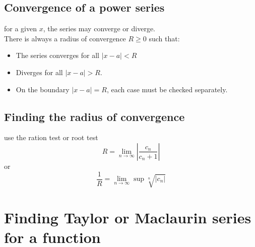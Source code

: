 \documentclass{article}
\begin{document}
                                    \subsection{Convergence of a power series}
                                        for a given \(x\), the series may converge or diverge.\\ 
                                        There is always a radius of convergence \(R \geq 0\) such that: 
                                        \begin{itemize}
                                            \item The series converges for all \(| x - a| < R\)
                                            \item Diverges for all \(| x - a| > R\). 
                                            \item On the boundary \(| x - a| = R\), each case must be checked separately.
                                        \end{itemize}
                                    \subsection{Finding the radius of convergence}
                                        use the ration test or root test 
                                            \[R = \lim_{n \to \infty} | \frac{c_n}{c_n + 1}|\]
                                        or 
                                            \[\frac{1}{R} = \lim_{n \to \infty}\sup \sqrt[n]{|c_n|}\] 
                        \section{Finding Taylor or Maclaurin series for a function}
\end{document}
